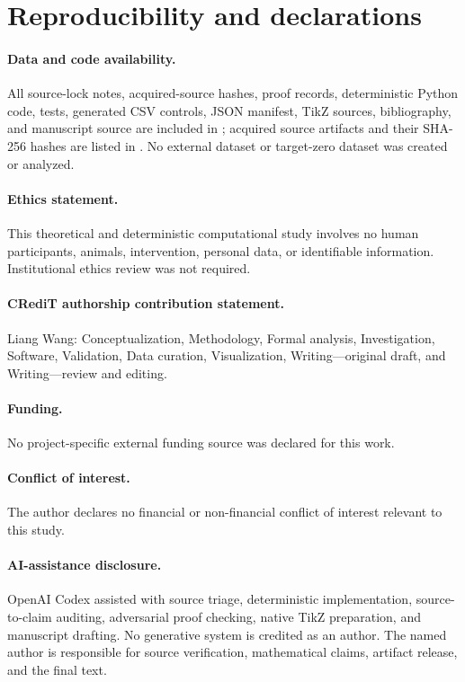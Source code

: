 \documentclass[11pt]{article}
\theoremstyle{definition}
\theoremstyle{remark}
\begin{document}
\section*{Reproducibility and declarations}

\paragraph{Data and code availability.}
All source-lock notes, acquired-source hashes, proof records, deterministic
Python code, tests, generated CSV controls, JSON manifest, TikZ sources,
bibliography, and manuscript source are included in
; acquired source artifacts and their SHA-256
hashes are listed in .  No external dataset or
target-zero dataset was created or analyzed.

\paragraph{Ethics statement.}
This theoretical and deterministic computational study involves no human
participants, animals, intervention, personal data, or identifiable
information.  Institutional ethics review was not required.

\paragraph{CRediT authorship contribution statement.}
Liang Wang: Conceptualization, Methodology, Formal analysis, Investigation,
Software, Validation, Data curation, Visualization, Writing---original draft,
and Writing---review and editing.

\paragraph{Funding.}
No project-specific external funding source was declared for this work.

\paragraph{Conflict of interest.}
The author declares no financial or non-financial conflict of interest
relevant to this study.

\paragraph{AI-assistance disclosure.}
OpenAI Codex assisted with source triage, deterministic implementation,
source-to-claim auditing, adversarial proof checking, native TikZ preparation,
and manuscript drafting.  No generative system is credited as an author.  The
named author is responsible for source verification, mathematical claims,
artifact release, and the final text.
\end{document}
